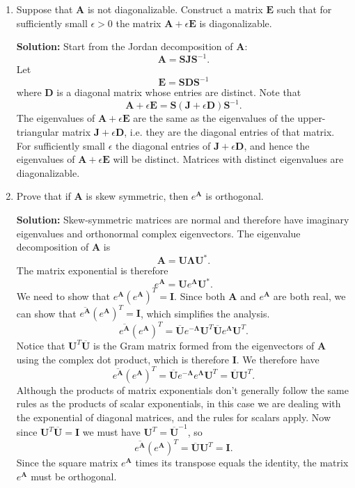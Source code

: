 \documentclass[11pt,fleqn]{article}
\newcommand{\mat}[1]{\mathbf{#1}}
\begin{document}
\begin{enumerate}
\item Suppose that $\mathbf{A}$ is not diagonalizable. Construct a matrix $\mathbf{E}$ such that for sufficiently small $\epsilon>0$ the matrix $\mathbf{A} + \epsilon\mathbf{E}$ is diagonalizable.

{\bf Solution:} Start from the Jordan decomposition of {\bf A}:
\[\mathbf{A} = \mathbf{SJS}^{-1}.\]
Let
\[\mathbf{E} = \mathbf{SDS}^{-1}\]
where $\mathbf{D}$ is a diagonal matrix whose entries are distinct.
Note that
\[\mathbf{A} + \epsilon\mathbf{E} = \mathbf{S}\left(\mathbf{J} + \epsilon \mathbf{D}\right)\mathbf{S}^{-1}.\]
The eigenvalues of $\mathbf{A} + \epsilon\mathbf{E}$ are the same as the eigenvalues of the upper-triangular matrix $\mathbf{J} + \epsilon \mathbf{D}$, i.e. they are the diagonal entries of that matrix.
For sufficiently small $\epsilon$ the diagonal entries of $\mathbf{J} + \epsilon \mathbf{D}$, and hence the eigenvalues of $\mathbf{A} + \epsilon\mathbf{E}$ will be distinct.
Matrices with distinct eigenvalues are diagonalizable.

\item Prove that if $\mat{A}$ is skew symmetric, then $e^{\mat{A}}$ is orthogonal.

{\bf Solution:} Skew-symmetric matrices are normal and therefore have imaginary eigenvalues and orthonormal complex eigenvectors. The eigenvalue decomposition of {\bf A} is
\[\mathbf{A} = \mathbf{U\Lambda U}^*.\]
The matrix exponential is therefore
\[e^{\mathbf{A}} = \mathbf{U}e^{\mathbf{\Lambda}} \mathbf{U}^*.\]
We need to show that $e^{\mathbf{A}}(e^{\mathbf{A}})^T = \mathbf{I}$.
Since both {\bf A} and $e^{\mathbf{A}}$ are both real, we can show that $\overline{e^{\mathbf{A}}}(e^{\mathbf{A}})^T = \mathbf{I}$, which simplifies the analysis.
\[\overline{e^{\mathbf{A}}}(e^{\mathbf{A}})^T = \overline{\mathbf{U}}e^{-\mathbf{\Lambda}} \mathbf{U}^T\overline{\mathbf{U}}e^{\mathbf{\Lambda}} \mathbf{U}^T.\]
Notice that $\mathbf{U}^T\overline{\mathbf{U}}$ is the Gram matrix formed from the eigenvectors of {\bf A} using the complex dot product, which is therefore {\bf I}.
We therefore have
\[\overline{e^{\mathbf{A}}}(e^{\mathbf{A}})^T = \overline{\mathbf{U}}e^{-\mathbf{\Lambda}}e^{\mathbf{\Lambda}} \mathbf{U}^T=\overline{\mathbf{U}}\mathbf{U}^T.\]
Although the products of matrix exponentials don't generally follow the same rules as the products of scalar exponentials, in this case we are dealing with the exponential of diagonal matrices, and the rules for scalars apply.
Now since $\mathbf{U}^T\overline{\mathbf{U}} = \mathbf{I}$ we must have $\mathbf{U}^T = \overline{\mathbf{U}}^{-1}$, so
\[\overline{e^{\mathbf{A}}}(e^{\mathbf{A}})^T =\overline{\mathbf{U}}\mathbf{U}^T = \mathbf{I}.\]
Since the square matrix $e^{\mathbf{A}}$ times its transpose equals the identity, the matrix $e^{\mathbf{A}}$ must be orthogonal.


\end{enumerate}
\end{document}
